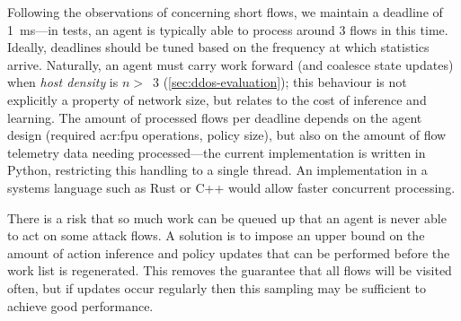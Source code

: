 Following the observations of \Textcite{DBLP:conf/sigcomm/ChenL0L18} concerning short flows, we maintain a deadline of \qty{1}{\milli\second}---in tests, an agent is typically able to process around \num{3} flows in this time.
Ideally, deadlines should be tuned based on the frequency at which statistics arrive.
Naturally, an agent must carry work forward (and coalesce state updates) when \emph{host density} is $n>$~3 (\cref{sec:ddos-evaluation}); this behaviour is not explicitly a property of network size, but relates to the cost of inference and learning.
The amount of processed flows per deadline depends on the agent design (required \gls{acr:fpu} operations, policy size), but also on the amount of flow telemetry data needing processed---the current implementation is written in Python, restricting this handling to a single thread.
An implementation in a systems language such as Rust or C++ would allow faster concurrent processing.

There is a risk that so much work can be queued up that an agent is never able to act on some attack flows.
A solution is to impose an upper bound on the amount of action inference and policy updates that can be performed before the work list is regenerated.
This removes the guarantee that all flows will be visited often, but if updates occur regularly then this sampling may be sufficient to achieve good performance.